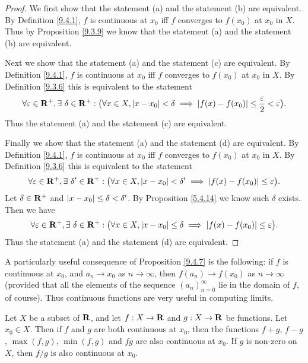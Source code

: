 \begin{proof}
    We first show that the statement (a) and the statement (b) are equivalent.
    By Definition \ref{9.4.1}, \(f\) is continuous at \(x_0\) iff \(f\) converges to \(f(x_0)\) at \(x_0\) in \(X\).
    Thus by Proposition \ref{9.3.9} we know that the statement (a) and the statement (b) are equivalent.

    Next we show that the statement (a) and the statement (c) are equivalent.
    By Definition \ref{9.4.1}, \(f\) is continuous at \(x_0\) iff \(f\) converges to \(f(x_0)\) at \(x_0\) in \(X\).
    By Definition \ref{9.3.6} this is equivalent to the statement
    \[
        \forall \varepsilon \in \R^+, \exists\ \delta \in \R^+ : \big(\forall x \in X, \abs{x - x_0} < \delta \implies \abs{f(x) - f(x_0)} \leq \frac{\varepsilon}{2} < \varepsilon\big).
    \]
    Thus the statement (a) and the statement (c) are equivalent.

    Finally we show that the statement (a) and the statement (d) are equivalent.
    By Definition \ref{9.4.1}, \(f\) is continuous at \(x_0\) iff \(f\) converges to \(f(x_0)\) at \(x_0\) in \(X\).
    By Definition \ref{9.3.6} this is equivalent to the statement
    \[
        \forall \varepsilon \in \R^+, \exists\ \delta' \in \R^+ : \big(\forall x \in X, \abs{x - x_0} < \delta' \implies \abs{f(x) - f(x_0)} \leq \varepsilon\big).
    \]
    Let \(\delta \in \mathbf{R}^+\) and \(\left\lvert x - x_0\right\rvert \leq \delta < \delta'\).
    By Proposition \ref{5.4.14} we know such \(\delta\) exists.
    Then we have
    \[
        \forall \varepsilon \in \mathbf{R}^+, \exists\ \delta \in \mathbf{R}^+ : \big(\forall x \in X, \left\lvert x - x_0\right\rvert \leq \delta \implies \left\lvert f(x) - f(x_0)\right\rvert \leq \varepsilon\big).
    \]
    Thus the statement (a) and the statement (d) are equivalent.
\end{proof}

\begin{remark}\label{9.4.8}
    A particularly useful consequence of Proposition \ref{9.4.7} is the following:
    if \(f\) is continuous at \(x_0\), and \(a_n \to x_0\) as \(n \to \infty\), then \(f(a_n) \to f(x_0)\) as \(n \to \infty\)
    (provided that all the elements of the sequence \((a_n)_{n = 0}^\infty\) lie in the domain of \(f\), of course).
    Thus continuous functions are very useful in computing limits.
\end{remark}

\begin{proposition}\label{9.4.9}
    Let \(X\) be a subset of \(\mathbf{R}\), and let \(f : X \to \mathbf{R}\) and \(g : X \to \mathbf{R}\) be functions.
    Let \(x_0 \in X\).
    Then if \(f\) and \(g\) are both continuous at \(x_0\), then the functions \(f + g\), \(f - g\), \(\max(f, g)\), \(\min(f, g)\) and \(fg\) are also continuous at \(x_0\).
    If \(g\) is non-zero on \(X\), then \(f / g\) is also continuous at \(x_0\).
\end{proposition}

